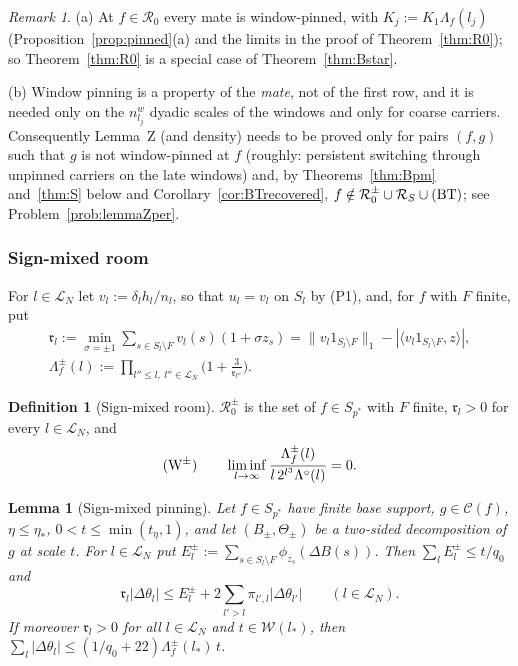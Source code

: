 \documentclass[10pt]{amsart}
\newtheorem{lemma}[theorem]{Lemma}
\theoremstyle{definition}
\newtheorem{definition}[theorem]{Definition}
\theoremstyle{remark}
\newtheorem{remark}[theorem]{Remark}
\newcommand{\Cset}{\mathcal C}
\newcommand{\ip}[2]{\langle #1,#2\rangle}
\begin{document}
\begin{remark}\label{rem:Bstar}
(a) At $f\in\mathcal R_0$ every mate is window-pinned, with
$K_j:=K_1\Lambda_f(l_j)$ (Proposition~\ref{prop:pinned}(a) and the limits
in the proof of Theorem~\ref{thm:R0}); so Theorem~\ref{thm:R0} is a special
case of Theorem~\ref{thm:Bstar}.

(b) Window pinning is a property of the \emph{mate}, not of the first row,
and it is needed only on the $n^w_{l_j}$ dyadic scales of the windows and
only for coarse carriers.  Consequently Lemma~Z (and density) needs to be
proved only for pairs $(f,g)$ such that $g$ is not window-pinned at $f$
(roughly: persistent switching through unpinned carriers on the late
windows) and, by Theorems~\ref{thm:Bpm} and~\ref{thm:S} below and
Corollary~\ref{cor:BTrecovered}, $f\notin\mathcal R_0^\pm\cup\mathcal
R_S\cup\textup{(BT)}$; see Problem~\ref{prob:lemmaZper}.
\end{remark}

\subsubsection*{Sign-mixed room}
For $l\in\mathcal L_N$ let $v_l:=\delta_lh_l/n_l$, so that $u_l=v_l$ on
$S_l$ by (P1), and, for $f$ with $F$ finite, put
\begin{gather*}
 \mathfrak r_l:=\min_{\sigma=\pm1}\sum_{s\in S_l\setminus F}v_l(s)
 (1+\sigma z_s)=\|v_l1_{S_l\setminus F}\|_1-|\ip{v_l1_{S_l\setminus F}}z|,\\
 \Lambda^\pm_f(l):=\prod_{l''\le l,\ l''\in\mathcal L_N}\Big(1+
 \frac3{\mathfrak r_{l''}}\Big).
\end{gather*}

\begin{definition}[Sign-mixed room]\label{def:R0pm}
$\mathcal R_0^\pm$ is the set of $f\in S_{p^*}$ with $F$ finite,
$\mathfrak r_l>0$ for every $l\in\mathcal L_N$, and
\[
 \textup{(W$^\pm$)}\qquad\liminf_{l\to\infty}\frac{\Lambda^\pm_f(l)}
 {l\,2^{l^3}\Lambda^\circ(l)}=0 .
\]
\end{definition}

\begin{lemma}[Sign-mixed pinning]\label{lem:signmixed}
Let $f\in S_{p^*}$ have finite base support, $g\in\Cset(f)$, $\eta\le
\eta_*$, $0<t\le\min(t_\eta,1)$, and let $(B_\pm,\Theta_\pm)$ be a
two-sided decomposition of $g$ at scale $t$.  For $l\in\mathcal L_N$ put
$E^\pm_l:=\sum_{s\in S_l\setminus F}\phi_{z_s}(\Delta B(s))$.  Then
$\sum_lE^\pm_l\le t/q_0$ and
\[
 \mathfrak r_l|\Delta\theta_l|\le E^\pm_l+2\sum_{l'>l}\pi_{l',l}
 |\Delta\theta_{l'}|\qquad(l\in\mathcal L_N).
\]
If moreover $\mathfrak r_l>0$ for all $l\in\mathcal L_N$ and
$t\in\mathcal W(l_*)$, then $\sum_l|\Delta\theta_l|\le(1/q_0+22)
\Lambda^\pm_f(l_*)\,t$.
\end{lemma}
\end{document}
